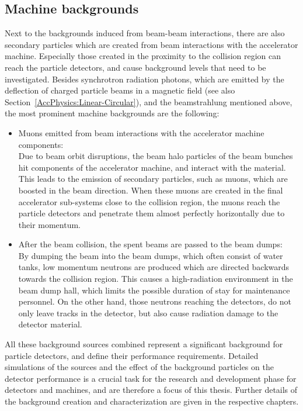 \subsection{Machine backgrounds}
\label{MachineBackgrounds}

Next to the backgrounds induced from beam-beam interactions, there are also secondary particles which are created from beam interactions with the accelerator machine.
Especially those created in the proximity to the collision region can reach the particle detectors, and cause background levels that need to be investigated.
Besides synchrotron radiation photons, which are emitted by the deflection of charged particle beams in a magnetic field (see also Section~\ref{AccPhysics:Linear-Circular}), and the beamstrahlung mentioned above, the most prominent machine backgrounds are the following:
\begin{itemize}
 \item Muons emitted from beam interactions with the accelerator machine components:
 \\Due to beam orbit disruptions, the beam halo particles of the beam bunches hit components of the accelerator machine, and interact with the material.
 This leads to the emission of secondary particles, such as muons, which are boosted in the beam direction.
 When these muons are created in the final accelerator sub-systems close to the collision region, the muons reach the particle detectors and penetrate them almost perfectly horizontally due to their momentum.
 \item After the beam collision, the spent beams are passed to the beam dumps:
 \\By dumping the beam into the beam dumps, which often consist of water tanks, low momentum neutrons are produced which are directed backwards towards the collision region.
 This causes a high-radiation environment in the beam dump hall, which limits the possible duration of stay for maintenance personnel.
 On the other hand, those neutrons reaching the detectors, do not only leave tracks in the detector, but also cause radiation damage to the detector material.
\end{itemize}
All these background sources combined represent a significant background for particle detectors, and define their performance requirements.
Detailed simulations of the sources and the effect of the background particles on the detector performance is a crucial task for the research and development phase for detectors and machines, and are therefore a focus of this thesis.
Further details of the background creation and characterization are given in the respective chapters.
